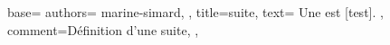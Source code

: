 {
  base={
    authors={
      marine-simard,
    },
    title=suite,
    text={
      Une  est [test].
    },
    comment={Définition d'une suite},
  },
}
